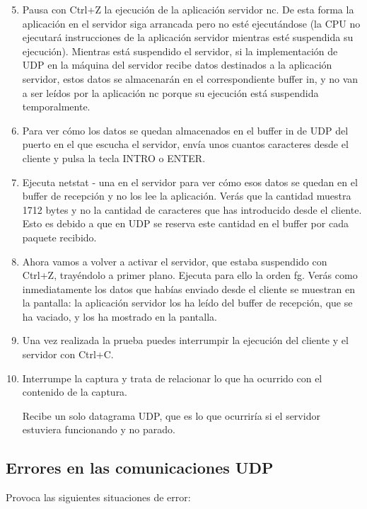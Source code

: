 \documentclass[12pt, a4paper]{report}
\begin{document}
\begin{enumerate}
	\setcounter{enumi}{4}
	\item Pausa con Ctrl+Z la ejecución de la aplicación servidor nc. De esta forma la aplicación en el servidor siga arrancada pero no esté ejecutándose (la CPU no ejecutará instrucciones de la aplicación servidor mientras esté suspendida su ejecución). Mientras está suspendido el servidor, si la implementación de UDP en la máquina del servidor recibe datos destinados a la aplicación servidor, estos datos se almacenarán en el correspondiente buffer in, y no van a ser leídos por la aplicación nc porque su ejecución está suspendida temporalmente.
	
	\item Para ver cómo los datos se quedan almacenados en el buffer in de UDP del puerto en el que escucha el servidor, envía unos cuantos caracteres desde el cliente y pulsa la tecla INTRO o ENTER.
	
	\item Ejecuta netstat - una en el servidor para ver cómo esos datos se quedan en el buffer de recepción y no los lee la aplicación. Verás que la cantidad muestra 1712 bytes y no la cantidad de caracteres que has introducido desde el cliente. Esto es debido a que en UDP se reserva este cantidad en el buffer por cada paquete recibido.
	
	\item Ahora vamos a volver a activar el servidor, que estaba suspendido con Ctrl+Z, trayéndolo a primer plano. Ejecuta para ello la orden fg. Verás como inmediatamente los datos que habías enviado desde el cliente se muestran en la pantalla: la aplicación servidor los ha leído del buffer de recepción, que se ha vaciado, y los ha mostrado en la pantalla.
	
	\item Una vez realizada la prueba puedes interrumpir la ejecución del cliente y el servidor con Ctrl+C.
	
	\item Interrumpe la captura y trata de relacionar lo que ha ocurrido con el contenido de la captura.
	
	Recibe un solo datagrama UDP, que es lo que ocurriría si el servidor estuviera funcionando y no parado. 
	
\end{enumerate}

\subsection{Errores en las comunicaciones UDP}
Provoca las siguientes situaciones de error:
\end{document}

